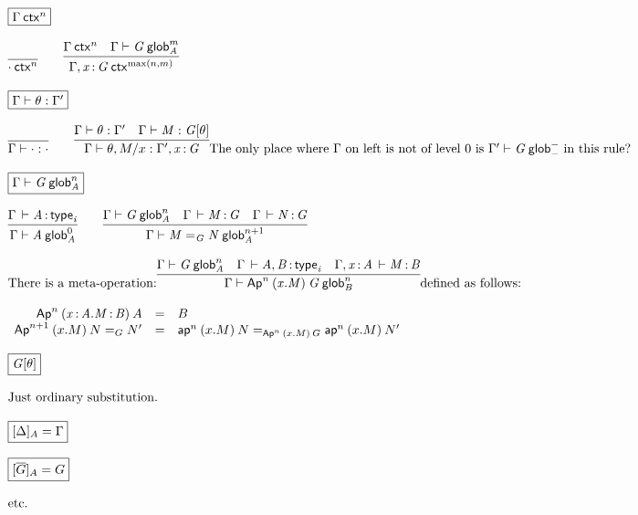 \begin{small}
\[
\begin{array}{l}
\framebox{\wfctx{\Gamma}{n}} \\ \\

\infer{\wfctx{\cdot}{n}}{}
\qquad
\infer{\wfctx{\Gamma,\tptm{x}{G}}{{\max(n,m)}}}
       {\wfctx{\Gamma}{n} &
        \wfglob{\Gamma}{G}{m}{A}}
\\ \\

\framebox{\wfsub{\Gamma}{\theta}{\Gamma'}} \\ \\

\infer{\wfsub{\Gamma}{\cdot}{\cdot}}{}
\qquad
\infer{\wfsub{\Gamma}{\theta,M/x}{\Gamma',\tptm{x}{G}}}
      {\wfsub{\Gamma}{\theta}{\Gamma'} &
       \ofglob{\Gamma}{M}{\tsubst{G}{\theta}}}
\text{The only place where $\Gamma$ on left is not of level 0 is $\wfglob{\Gamma'}{G}{-}{-}$
  in this rule?}\\ \\


\framebox{\wfglob{\Gamma}{G}{n}{A}} \\ \\

\infer{\wfglob{\Gamma}{A}{0}{A}}
      {\oftp{\Gamma}{A}{\typ{i}}}
\qquad
\infer{\wfglob{\Gamma}{\homj{G}{M}{N}}{n+1}{A}}
      {\wfglob{\Gamma}{G}{n}{A} &
        \oftp{\Gamma}{M}{G} &
        \oftp{\Gamma}{N}{G}
      }
\\ \\

\text{There is a meta-operation:}
\infer{\wfglob{\Gamma}{\Apn{n}{(x.M)}{G}}{n}{B}}
      {\wfglob{\Gamma}{G}{n}{A} &
       \oftp{\Gamma}{A,B}{\typ{i}} & 
       \oftp{\Gamma,\tptm{x}{A}}{M}{B}}
\text{defined as follows:}
\\ \\
\begin{array}{rcl}
\Apn{n}{(\tptm{x}{A}.\tptm{M}{B})}{A} & = & {B} \\
\Apn{n+1}{(x.M)}{\homj{G}{N}{N'}} & = & \homj{\Apn{n}{(x.M)}{G}}{\apn{n}{(x.M)}{N}}{\apn{n}{(x.M)}{N'}} \\
\end{array}

\\ \\

\framebox{\tsubst{G}{\theta}}
\\ \\

\text{Just ordinary substitution.}
\\ \\

\framebox{$\interpdiag{\Delta}{A} = \Gamma$} \\ \\
\framebox{$\interpdiag{\diag{G}}{A} = G$} \\ \\
\text{etc.}

\\ \\
\end{array}
\]
\end{small}

